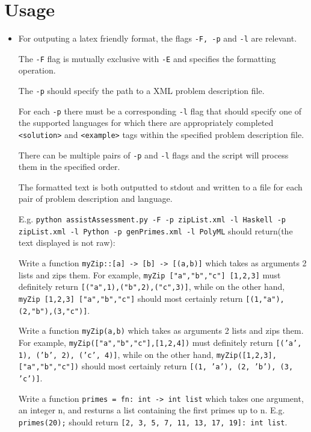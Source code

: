\documentclass[a4paper,12pt]{article}
\begin{document}
\section{Usage}
\begin{itemize}
 
 \item 

 For outputing a latex friendly format, the flags \texttt{-F, -p} and \texttt{-l} are relevant. 

 The \texttt{-F} flag is mutually exclusive with \texttt{-E} and specifies the formatting operation. 

 The \texttt{-p} should specify the path to a XML problem description file. 

 For each \texttt{-p} there must be a corresponding \texttt{-l} flag that should specify one of the supported languages for which there are appropriately completed \texttt{<solution>} and \texttt{<example>} tags within the specified problem description file.

 There can be multiple pairs of \texttt{-p} and \texttt{-l} flags and the script will process them in the specified order.
 
 The formatted text is both outputted to stdout and written to a file for each pair of problem description and language.
 
 E.g. \texttt{python assistAssessment.py -F -p zipList.xml -l Haskell -p zipList.xml -l Python -p genPrimes.xml -l PolyML} should return(the text displayed is not raw):
 
 Write a function \texttt{myZip::[a] -> [b] -> [(a,b)]} which takes as arguments 2 lists and zips them. For example, \texttt{myZip ["a","b","c"] [1,2,3]} must definitely return \texttt{[("a",1),("b",2),("c",3)]}, while on the other hand, \texttt{myZip [1,2,3] ["a","b","c"]} should most certainly return \texttt{[(1,"a"),(2,"b"),(3,"c")]}.

Write a function \texttt{myZip(a,b)} which takes as arguments 2 lists and zips them. For example, \texttt{myZip(["a","b","c"],[1,2,4])} must definitely return \texttt{[('a', 1), ('b', 2), ('c', 4)]}, while on the other hand, \texttt{myZip([1,2,3],["a","b","c"])} should most certainly return \texttt{[(1, 'a'), (2, 'b'), (3, 'c')]}.

Write a function \texttt{primes = fn: int -> int list} which takes one argument, an integer n, and resturns a list containing the first primes up to n. E.g. \texttt{primes(20);} should return \texttt{[2, 3, 5, 7, 11, 13, 17, 19]: int list}.
 

\end{itemize}
\end{document}
